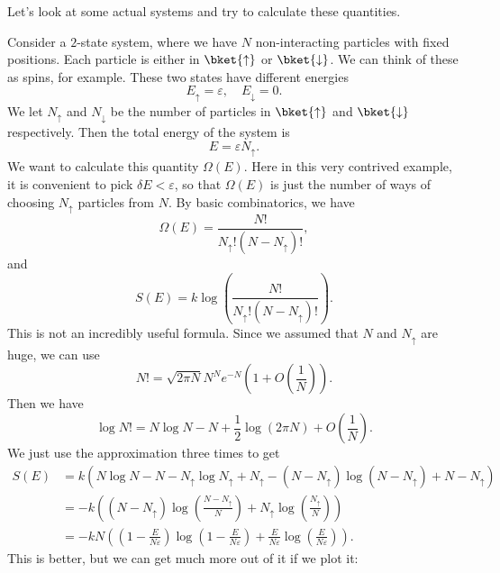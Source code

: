 \documentclass[a4paper]{article}
\begin{document}
Let's look at some actual systems and try to calculate these quantities.
\begin{eg}
  Consider a $2$-state system, where we have $N$ non-interacting particles with fixed positions. Each particle is either in $\bket{\uparrow}$ or $\bket{\downarrow}$. We can think of these as spins, for example. These two states have different energies
  \[
    E_{\uparrow} = \varepsilon,\quad E_{\downarrow} = 0.
  \]
  We let $N_{\uparrow}$ and $N_{\downarrow}$ be the number of particles in $\bket{\uparrow}$ and $\bket{\downarrow}$ respectively. Then the total energy of the system is
  \[
    E = \varepsilon N_{\uparrow}.
  \]
  We want to calculate this quantity $\Omega(E)$. Here in this very contrived example, it is convenient to pick $\delta E < \varepsilon$, so that $\Omega(E)$ is just the number of ways of choosing $N_{\uparrow}$ particles from $N$. By basic combinatorics, we have
  \[
    \Omega(E) = \frac{N!}{N_{\uparrow}! (N - N_\uparrow)!},
  \]
  and
  \[
    S(E) = k \log \left(\frac{N!}{N_{\uparrow}! (N - N_\uparrow)!}\right).
  \]
  This is not an incredibly useful formula. Since we assumed that $N$ and $N_\uparrow$ are huge, we can use 
  \[
    N! = \sqrt{2\pi N} N^N e^{-N} \left(1 + O\left(\frac{1}{N}\right)\right).
  \]
  Then we have
  \[
    \log N! = N \log N - N + \frac{1}{2}\log (2\pi N) + O\left(\frac{1}{N}\right).
  \]
  We just use the approximation three times to get
  \begin{align*}
    S(E) &= k\left(N \log N - N - N_\uparrow \log N_\uparrow + N_\uparrow - (N - N_\uparrow) \log(N - N_\uparrow) + N - N_\uparrow\right)\\
    &= -k \left((N - N_\uparrow) \log \left(\frac{N - N_\uparrow}{N}\right) + N_\uparrow \log\left(\frac{N_{\uparrow}}{N}\right)\right)\\
    &= -kN\left(\left(1 - \frac{E}{N\varepsilon}\right) \log\left(1 - \frac{E}{N\varepsilon}\right) + \frac{E}{N\varepsilon} \log\left(\frac{E}{N\varepsilon}\right)\right).
  \end{align*}
  This is better, but we can get much more out of it if we plot it:
  \begin{center}
\end{center}
\end{eg}
\end{document}
